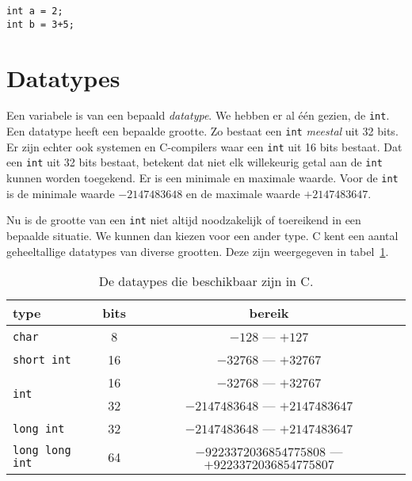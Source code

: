 \hspace*{1em}\texttt{int a = 2;}\\
\hspace*{1em}\texttt{int b = 3+5;}\\

\section{Datatypes}
Een variabele is van een bepaald \textsl{datatype}. We hebben er al één gezien, de \texttt{int}. Een datatype heeft een bepaalde grootte. Zo bestaat een \texttt{int} \textsl{meestal} uit 32 bits. Er zijn echter ook systemen en C-compilers waar een \texttt{int} uit 16 bits bestaat. Dat een \texttt{int} uit 32 bits bestaat, betekent dat niet elk willekeurig getal aan de \texttt{int} kunnen worden toegekend. Er is een minimale en maximale waarde. Voor de \texttt{int} is de minimale waarde $-2147483648$ en de maximale waarde $+2147483647$.

Nu is de grootte van een \texttt{int} niet altijd noodzakelijk of toereikend in een bepaalde situatie. We kunnen dan kiezen voor een ander type. C kent een aantal geheeltallige datatypes van diverse grootten. Deze zijn weergegeven in tabel~\ref{tab:varintdatatypes}.

\begin{table}[!ht]
\centering
\caption{De dataypes die beschikbaar zijn in C.}
\label{tab:varintdatatypes}
\begin{tabular}{@{}lcc@{}}
\toprule
\textbf{type}          & \textbf{bits} & \textbf{bereik}  \\ \midrule
\texttt{char}          & 8                       & $-128$ --- $+127$  \\
\texttt{short int}     & 16                      & $-32768$ --- $+32767$ \\
\multirow{2}{*}{\texttt{int}}   & 16                      & $-32768$ --- $+32767$ \\
                       & 32                      & $-2147483648$ --- $+2147483647$ \\
\texttt{long int}      & 32                      & $-2147483648$ --- $+2147483647$  \\
\texttt{long long int} & 64                      & $-9223372036854775808$ --- $+9223372036854775807$  \\
   \bottomrule
\end{tabular}
\end{table}

